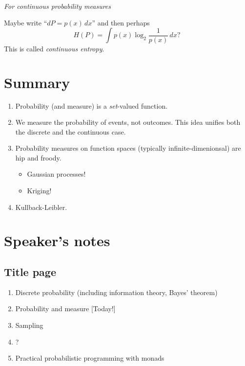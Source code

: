 \documentclass[11pt]{article}
\begin{document}
\hrulefill

\emph{For continuous probability measures}

Maybe write ``$dP = p(x)\,dx$'' and then perhaps
\[
H(P) = \int p(x)\log_2\frac{1}{p(x)}\,dx ?
\]
This is called \emph{continuous entropy}. 

\newpage
\section*{Summary}
\begin{enumerate}
\item Probability (and measure) is a \emph{set}-valued function.
\item We measure the probability of events, not outcomes. This idea unifies
    both the discrete and the continuous case.
  \item Probability measures on function spaces (typically infinite-dimenionsal)
    are hip and froody.
    \begin{itemize}
    \item Gaussian processes!
    \item Kriging!
    \end{itemize}
  \item Kullback-Leibler.
\end{enumerate}



\newpage
\section*{Speaker's notes}
\subsection*{Title page}
\begin{enumerate}
\item Discrete probability (including information theory, Bayes' theorem)
\item Probability and measure [Today!]
\item Sampling
\item ?
\item Practical probabilistic programming with monads 
\end{enumerate}
\end{document}
